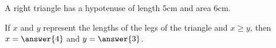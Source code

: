 \documentclass{ximera}
\author{Kenneth Berglund}
\begin{document}
\begin{exercise}
A right triangle has a hypotenuse of length $5$cm and area 6cm. 

If $x$ and $y$ represent the lengths of the legs of the triangle and $x \ge y$, then $x = \answer{4}$ and $y = \answer{3}$. 

\end{exercise}
\end{document}

